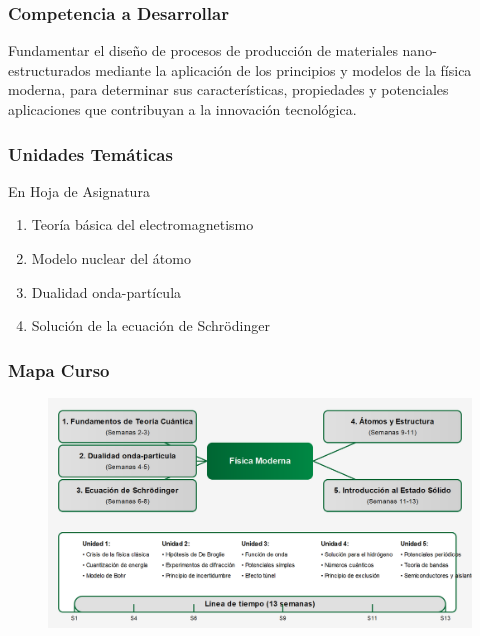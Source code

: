 \documentclass{beamer}
\begin{document}
\begin{frame}
    \frametitle{Competencia a Desarrollar}
   
   Fundamentar el diseño de procesos de producción de materiales nano-estructurados mediante la aplicación de los principios y modelos de la física moderna, para determinar sus características, propiedades y potenciales aplicaciones que contribuyan a la innovación tecnológica.
   
\end{frame}

\begin{frame}
    \frametitle{Unidades Temáticas}
    En Hoja de Asignatura
    \begin{enumerate}
    	\item Teoría básica del electromagnetismo  
    	\item Modelo nuclear del átomo 
    	\item Dualidad onda-partícula
    	\item Solución de la ecuación de Schrödinger
    \end{enumerate}
    
\end{frame}
\begin{frame}[plain]
	\frametitle{Mapa Curso}
	\begin{figure}
		\centering
		\includegraphics[width=1\linewidth]{../Imagenes/mapafisica.png}
	\end{figure}	
	
	\note{}	
\end{frame}
\end{document}
